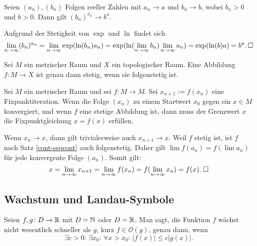 \begin{Satz}
Seien $(a_n),(b_n)$ Folgen reeller Zahlen mit $a_n\to a$ und $b_n\to b$,
wobei $b_n>0$ und $b>0$. Dann gilt $(b_n)^{a_n}\to b^a$.
\end{Satz}
\begin{Beweis}
Aufgrund der Stetigkeit von $\exp$ und $\ln$ findet sich
\[\lim_{n\to\infty} (b_n)^{a_n} = \lim_{n\to\infty} \exp(\ln(b_n)a_n)
= \exp(\ln(\lim_{n\to\infty} b_n) \lim_{n\to\infty} a_n)
= \exp(\ln(b)a) = b^a.\,\square\]
\end{Beweis}

\newpage
\begin{Satz}\label{cont-seqcont}%
Sei $M$ ein metrischer Raum und $X$ ein topologischer Raum.
Eine Abbildung $f\colon M\to X$ ist genau dann stetig, wenn
sie folgenstetig ist.
\end{Satz}

\begin{Satz}
Sei $M$ ein metrischer Raum und sei $f\colon M\to M$.
Sei $x_{n+1}:=f(x_n)$ eine Fixpunktiteration. Wenn die Folge
$(x_n)$ zu einem Startwert $x_0$ gegen ein $x\in M$ konvergiert, und
wenn $f$ eine stetige Abbildung ist, dann muss der Grenzwert $x$ die
Fixpunktgleichung $x=f(x)$ erfüllen.
\end{Satz}

\begin{Beweis}
Wenn $x_n\to x$, dann gilt trivialerweise auch $x_{n+1}\to x$.
Weil $f$ stetig ist, ist $f$ nach Satz \ref{cont-seqcont}
auch folgenstetig. Daher gilt $\lim f(a_n) = f(\lim a_n)$ für jede
konvergente Folge $(a_n)$. Somit gilt:%
\[x = \lim_{n\to\infty} x_{n+1} = \lim_{n\to\infty} f(x_n)
= f(\lim_{n\to\infty} x_n) = f(x).\;\square\]
\end{Beweis}

\subsection{Wachstum und Landau-Symbole}
\begin{Definition}\label{Landau-O}
Seien $f,g\colon D\to\mathbb R$ mit $D=\mathbb N$ oder $D=\mathbb R$. Man sagt, die
Funktion $f$ wächst nicht wesentlich schneller als $g$, kurz
$f\in\mathcal O(g)$, genau dann, wenn%
\[\exists c{>}0\colon\,\exists x_0\colon\,\forall x{>}x_0\colon\, |f(x)|\le c|g(x)|.\]
\end{Definition}

